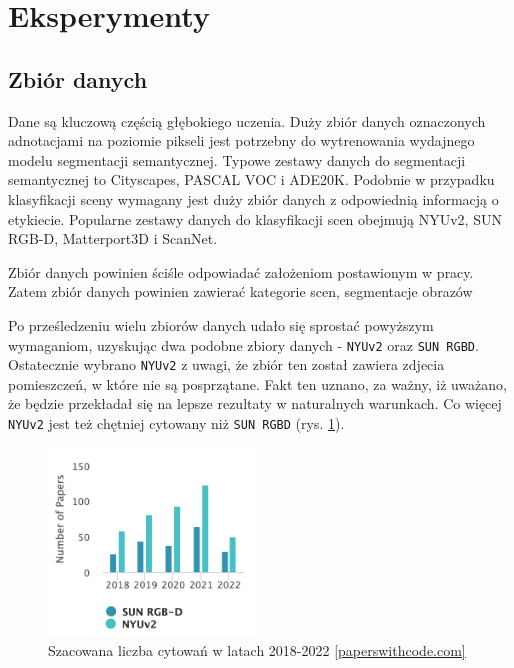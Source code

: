 \newpage %
\section{Eksperymenty}
\subsection{Zbiór  danych}
Dane są kluczową częścią głębokiego uczenia. Duży zbiór danych oznaczonych adnotacjami na poziomie pikseli jest potrzebny do wytrenowania wydajnego modelu segmentacji semantycznej. Typowe zestawy danych do segmentacji semantycznej to Cityscapes, PASCAL VOC i ADE20K. Podobnie w przypadku klasyfikacji sceny wymagany jest duży zbiór danych z odpowiednią informacją o etykiecie. Popularne zestawy danych do klasyfikacji scen obejmują  NYUv2, SUN RGB-D, Matterport3D i ScanNet.

Zbiór danych powinien ściśle odpowiadać założeniom postawionym w pracy. Zatem zbiór danych powinien zawierać kategorie scen, segmentacje obrazów 

Po prześledzeniu wielu zbiorów danych udało się sprostać powyższym wymaganiom, uzyskując dwa podobne zbiory danych - \texttt{NYUv2} oraz \texttt{SUN RGBD}. Ostatecznie wybrano \texttt{NYUv2} z uwagi, że zbiór ten został zawiera zdjecia
pomieszczeń, w które nie są posprzątane. Fakt ten uznano, za ważny, iż uważano, że będzie przekładał się na lepsze rezultaty w naturalnych warunkach. Co więcej \texttt{NYUv2} jest też chętniej cytowany niż \texttt{SUN RGBD} (rys. \ref{fig:sun-vs-nyu}).

\begin{figure}[ht!]
    \centering
    \includegraphics[width=0.5\textwidth]{img/stats-dataset.png}
    \caption[]{Szacowana liczba cytowań w latach 2018-2022 \href{https://paperswithcode.com/dataset/sun-rgb-d}{[paperswithcode.com]}}
    \label{fig:sun-vs-nyu}
\end{figure}

